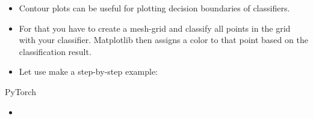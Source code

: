 \begin{frame}
	\begin{itemize}
		\item Contour plots can be useful for plotting decision boundaries of classifiers.
		\item For that you have to create a mesh-grid and classify all points in the grid with your classifier. Matplotlib then assigns a color
			to that point based on the classification result.
		\item Let use make a step-by-step example: 
	\end{itemize}
\end{frame}


\begin{frame}
	
\end{frame}


\begin{frame}
	
\end{frame}


\begin{frame}
\end{frame}


\begin{dwHeaderFrame}{PyTorch}
	\begin{itemize}
		\item
	\end{itemize}
\end{dwHeaderFrame}


\makethanks


